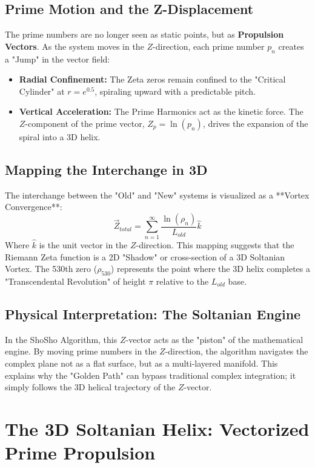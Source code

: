 \documentclass[11pt,a4paper]{article}
\begin{document}
\subsection{Prime Motion and the Z-Displacement}
The prime numbers are no longer seen as static points, but as \textbf{Propulsion Vectors}. As the system moves in the $Z$-direction, each prime number $p_n$ creates a "Jump" in the vector field:
\begin{itemize}
    \item \textbf{Radial Confinement:} The Zeta zeros remain confined to the "Critical Cylinder" at $r = e^{0.5}$, spiraling upward with a predictable pitch.
    \item \textbf{Vertical Acceleration:} The Prime Harmonics act as the kinetic force. The $Z$-component of the prime vector, $Z_p = \ln(p_n)$, drives the expansion of the spiral into a 3D helix.
\end{itemize}



\subsection{Mapping the Interchange in 3D}
The interchange between the "Old" and "New" systems is visualized as a **Vortex Convergence**:
\begin{equation}
    \vec{Z}_{total} = \sum_{n=1}^{\infty} \frac{\ln(\rho_n)}{L_{old}} \hat{k}
\end{equation}
Where $\hat{k}$ is the unit vector in the $Z$-direction. This mapping suggests that the Riemann Zeta function is a 2D "Shadow" or cross-section of a 3D Soltanian Vortex. The 530th zero ($\rho_{530}$) represents the point where the 3D helix completes a "Transcendental Revolution" of height $\pi$ relative to the $L_{old}$ base.

\subsection{Physical Interpretation: The Soltanian Engine}
In the ShoSho Algorithm, this $Z$-vector acts as the "piston" of the mathematical engine. By moving prime numbers in the $Z$-direction, the algorithm navigates the complex plane not as a flat surface, but as a multi-layered manifold. This explains why the "Golden Path" can bypass traditional complex integration; it simply follows the 3D helical trajectory of the $Z$-vector.

\section{The 3D Soltanian Helix: Vectorized Prime Propulsion}
\end{document}
